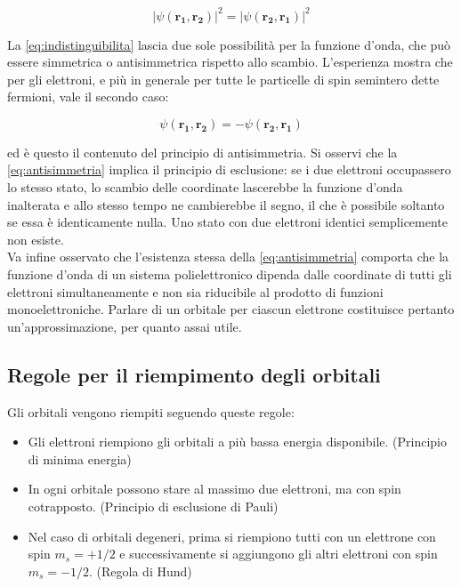 \begin{equation}
    |\psi(\mathbf{r_1},\mathbf{r_2})|^2 = |\psi(\mathbf{r_2},\mathbf{r_1})|^2
    \label{eq:indistinguibilita}
\end{equation}

La \eqref{eq:indistinguibilita} lascia due sole possibilità per la funzione d'onda, che può essere simmetrica o antisimmetrica rispetto allo scambio. 
L'esperienza mostra che per gli elettroni, e più in generale per tutte le particelle di spin semintero dette fermioni, vale il secondo caso:

\begin{equation}
    \psi(\mathbf{r_1},\mathbf{r_2}) = - \psi(\mathbf{r_2},\mathbf{r_1})
    \label{eq:antisimmetria}
\end{equation}

ed è questo il contenuto del principio di antisimmetria. 
Si osservi che la \eqref{eq:antisimmetria} implica il principio di esclusione: se i due elettroni occupassero lo stesso stato, lo 
scambio delle coordinate lascerebbe la funzione d'onda inalterata e allo stesso tempo ne cambierebbe il segno, il che è possibile soltanto se essa è identicamente nulla. 
Uno stato con due elettroni identici semplicemente non esiste.\\

Va infine osservato che l'esistenza stessa della \eqref{eq:antisimmetria} comporta che la funzione d'onda di un sistema polielettronico dipenda dalle coordinate di tutti gli elettroni simultaneamente e non sia riducibile al prodotto di funzioni monoelettroniche. 
Parlare di un orbitale per ciascun elettrone costituisce pertanto un'approssimazione, per quanto assai utile.

\subsection{Regole per il riempimento degli orbitali}

Gli orbitali vengono riempiti seguendo queste regole:

\begin{itemize}
    \item Gli elettroni riempiono gli orbitali a più bassa energia disponibile. (Principio di minima energia)
    \item In ogni orbitale possono stare al massimo due elettroni, ma con spin cotrapposto. (Principio di esclusione di Pauli)
    \item Nel caso di orbitali degeneri, prima si riempiono tutti con un elettrone con spin $m_s = + 1/2$ e successivamente si aggiungono gli altri elettroni con spin $m_s = - 1/2$. (Regola di Hund)
\end{itemize}